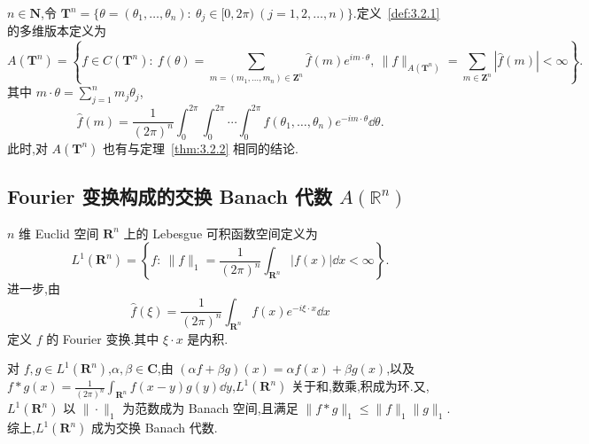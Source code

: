 \begin{note}\label{note:3.2.3}
$n \in \mathbf{N}$,令 $\mathbf{T}^{n} = \{\theta = (\theta_{1}, \ldots, \theta_{n}):\ \theta_{j} \in [0, 2\pi)\ (j = 1, 2, \ldots, n)\}$.定义~\ref{def:3.2.1} 的多维版本定义为
\begin{equation*}
A(\mathbf{T}^{n}) = \left\{f \in C(\mathbf{T}^{n}):\ f(\theta) = \sum_{m = (m_{1}, \ldots, m_{n}) \in \mathbf{Z}^{n}}\hat{f}(m)e^{im \cdot \theta},\ \|f\|_{A(\mathbf{T}^{n})} = \sum_{m \in \mathbf{Z}^{n}}|\hat{f}(m)| < \infty\right\}.
\end{equation*}
其中 $m \cdot \theta = \sum_{j=1}^{n}m_{j}\theta_{j}$,
\begin{equation*}
\hat{f}(m) = \frac{1}{(2\pi)^{n}}\int_{0}^{2\pi}\int_{0}^{2\pi}\cdots\int_{0}^{2\pi}f(\theta_{1}, \ldots, \theta_{n})e^{-im \cdot \theta}\dd\theta.
\end{equation*}
此时,对 $A(\mathbf{T}^{n})$ 也有与定理~\ref{thm:3.2.2} 相同的结论.
\end{note}

\subsection{\texorpdfstring{Fourier 变换构成的交换 Banach 代数 $A(\mathbb{R}^n)$}{Fourier 变换构成的交换 Banach 代数 A(R^n)}}\label{sec:3.2.2}

\begin{definition}\label{def:3.2.4}
$n$ 维 Euclid 空间 $\mathbf{R}^{n}$ 上的 Lebesgue 可积函数空间定义为
\begin{equation*}
L^{1}(\mathbf{R}^{n}) = \left\{f:\ \|f\|_{1} = \frac{1}{(2\pi)^{n}}\int_{\mathbf{R}^{n}}|f(x)|\dd x < \infty\right\}.
\end{equation*}
进一步,由
\begin{equation*}
\hat{f}(\xi) = \frac{1}{(2\pi)^{n}}\int_{\mathbf{R}^{n}}f(x)e^{-i\xi \cdot x}\dd x
\end{equation*}
定义 $f$ 的 Fourier 变换.其中 $\xi \cdot x$ 是内积.
\end{definition}

对 $f, g \in L^{1}(\mathbf{R}^{n})$,$\alpha, \beta \in \mathbf{C}$,由 $(\alpha f + \beta g)(x) = \alpha f(x) + \beta g(x)$,以及 $f * g(x) = \frac{1}{(2\pi)^{n}}\int_{\mathbf{R}^{n}}f(x - y)g(y)\dd y$,$L^{1}(\mathbf{R}^{n})$ 关于和,数乘,积成为环.又,$L^{1}(\mathbf{R}^{n})$ 以 $\|\cdot\|_{1}$ 为范数成为 Banach 空间,且满足 $\|f * g\|_{1} \leq \|f\|_{1}\|g\|_{1}$.综上,$L^{1}(\mathbf{R}^{n})$ 成为交换 Banach 代数.

